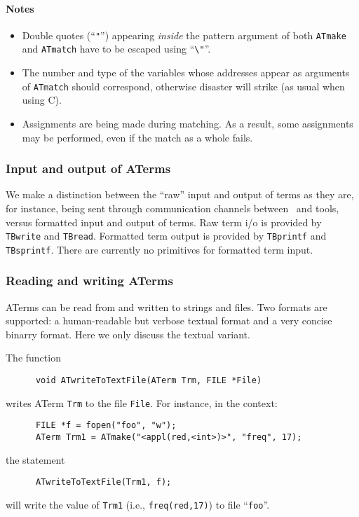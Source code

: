 \documentclass[twoside]{article} %
\begin{document}
\paragraph{Notes}
\begin{itemize}
\item Double quotes (``{\tt "}'') appearing {\em inside} the pattern argument
of both {\tt ATmake} and {\tt ATmatch} have to be escaped using ``\verb-\"-''.
\item The number and type of the variables whose addresses appear
as arguments of {\tt ATmatch} should correspond, otherwise disaster
will strike (as usual when using C).
\item Assignments are being made during matching. As a result, some assignments
may be performed, even if the match as a whole fails.

\end{itemize}

\subsubsection{\label{ATermIO}Input and output of ATerms}
We make a distinction between the ``raw'' input and output of terms
as they are, for instance, being sent through communication
channels between \TB\ and tools, versus formatted input and output
of terms. Raw term i/o is provided by {\tt TBwrite} and {\tt TBread}.
Formatted term output is provided by {\tt TBprintf} and {\tt TBsprintf}.
There are currently no primitives for formatted term input.

\subsubsection{\label{ATread/write}Reading and writing ATerms}

ATerms can be read from and written to strings and files.
Two formats are supported: a human-readable but verbose textual format
and a very concise binarry format. Here we only discuss the textual
variant.

The function
\begin{verbatim}
      void ATwriteToTextFile(ATerm Trm, FILE *File)
\end{verbatim}
writes ATerm {\tt Trm} to the file {\tt File}.
For instance, in the context:
\begin{verbatim}
      FILE *f = fopen("foo", "w");
      ATerm Trm1 = ATmake("<appl(red,<int>)>", "freq", 17);
\end{verbatim}
the statement
\begin{verbatim}
      ATwriteToTextFile(Trm1, f);
\end{verbatim}
will write the value of {\tt Trm1} (i.e., {\tt freq(red,17)})
to file ``{\tt foo}''.
\end{document}
